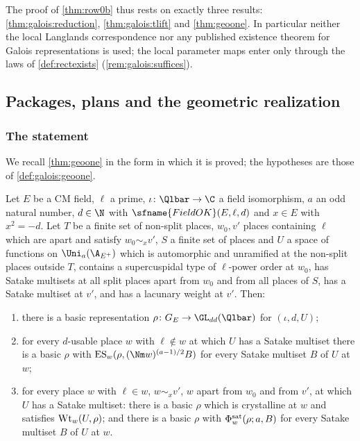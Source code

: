 \begin{remark}\label{pf:geo:rem:rowinputs}
The proof of \cref{thm:row0b} thus rests on exactly three results: \cref{thm:galois:reduction},
\cref{thm:galois:tlift} and \cref{thm:geoone}. In particular neither the local Langlands
correspondence nor any published existence theorem for Galois representations is used; the local
parameter maps enter only through the laws of \cref{def:rectexists} (\cref{rem:galois:suffices}).
\end{remark}

\subsection{Packages, plans and the geometric realization}\label{sec:pf:geo:geoone}

\subsubsection{The statement}

We recall \cref{thm:geoone} in the form in which it is proved; the hypotheses are those of
\cref{def:galois:geoone}.

\begin{theorem}\label{pf:geo:geoone}
Let $E$ be a CM field, $\ell$ a prime, $\iota\colon\Qlbar\to\C$ a field isomorphism, $a$ an odd natural
number, $d\in\N$ with $\sfname{FieldOK}(E,\ell,d)$ and $x\in E$ with $x^2=-d$. Let $T$ be a finite set of
non-split places, $w_0,v'$ places containing $\ell$ which are apart and satisfy $w_0\sim_xv'$, $S$ a
finite set of places and $U$ a space of functions on $\geoUa$ which is automorphic and unramified at
the non-split places outside $T$, contains a supercuspidal type of $\ell$-power order at $w_0$, has
Satake multisets at all split places apart from $w_0$ and from all places of $S$, has a Satake
multiset at $v'$, and has a lacunary weight at $v'$. Then:
\begin{enumerate}[label=\textup{(G\arabic*)},nosep]
\item there is a basic representation $\rho\colon G_E\to\GL_{dd}(\Qlbar)$ for $(\iota,d,U)$;
\item for every $d$-usable place $w$ with $\ell\notin w$ at which $U$ has a Satake multiset there is a
  basic $\rho$ with $\geoES_w(\rho,(\Nm w)^{(a-1)/2}B)$ for every Satake multiset $B$ of $U$ at $w$;
\item for every place $w$ with $\ell\in w$, $w\sim_xv'$, $w$ apart from $w_0$ and from $v'$, at which
  $U$ has a Satake multiset: there is a basic $\rho$ which is crystalline at $w$ and satisfies
  $\mathrm{Wt}_w(U,\rho)$; and there is a basic $\rho$ with $\Phi^{\mathrm{sat}}_w(\rho;a,B)$ for every
  Satake multiset $B$ of $U$ at $w$.
\end{enumerate}
\end{theorem}

